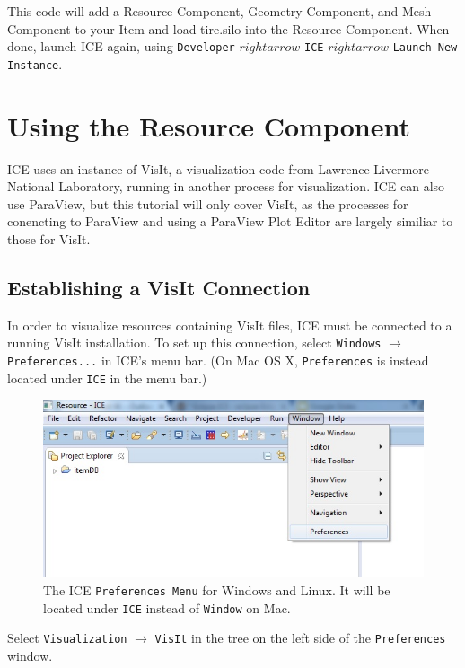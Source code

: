 This code will add a Resource Component, Geometry Component, and Mesh Component
to your Item and load tire.silo into the Resource Component. When done, launch
ICE again, using \texttt{Developer} $rightarrow$ \texttt{ICE} $rightarrow$
\texttt{Launch New Instance}.

\section{Using the Resource Component}

ICE uses an instance of VisIt, a visualization code from Lawrence Livermore
National Laboratory, running in another process for visualization. ICE can also
use ParaView, but this tutorial will only cover VisIt, as the processes for
conencting to ParaView and using a ParaView Plot Editor are largely similiar to
those for VisIt.

\subsection{Establishing a VisIt Connection}

In order to visualize resources containing VisIt files, ICE must be connected to
a running VisIt installation. To set up this connection, select \texttt{Windows}
$\rightarrow$ \texttt{Preferences...} in ICE's menu bar. (On Mac OS X,
\texttt{Preferences} is instead located under \texttt{ICE} in the menu
bar.)

\begin{figure}[!h]
\includegraphics[width=12cm]{images/ICEPreferences}
\centering
\caption{The ICE \texttt{Preferences Menu} for Windows and Linux. It will be
located under \texttt{ICE} instead of \texttt{Window} on Mac.}
\label{fig:icepreferences}
\end{figure}


Select \texttt{Visualization} $\rightarrow$ \texttt{VisIt} in the tree on the
left side of the \texttt{Preferences} window.

